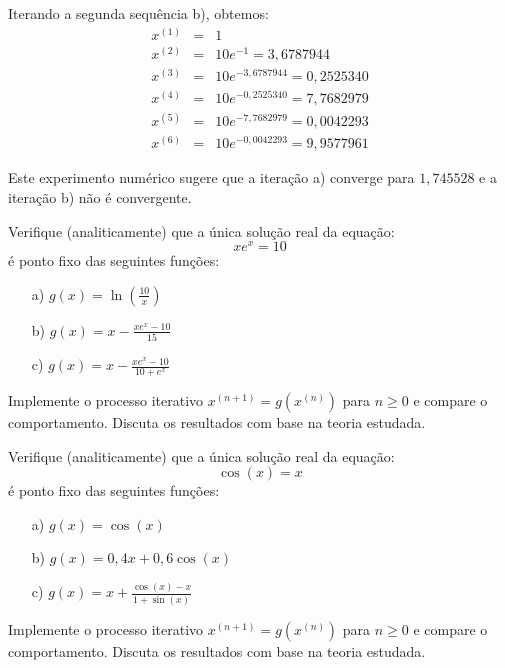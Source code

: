 \begin{ex}
\begin{resp}
Iterando a segunda sequência b), obtemos:
\begin{eqnarray}
x^{(1)}&=&1\\
x^{(2)}&=&10e^{-1}= 3,6787944   \\
x^{(3)}&=&10e^{- 3,6787944 }= 0,2525340     \\
x^{(4)}&=&10e^{-0,2525340}=  7,7682979      \\
x^{(5)}&=&10e^{-7,7682979}=  0,0042293      \\
x^{(6)}&=&10e^{-0,0042293}=  9,9577961
\end{eqnarray}

Este experimento numérico sugere que a iteração a) converge para $1,745528$ e a iteração b) não é convergente.

\end{resp}

\begin{exer} Verifique (analiticamente) que a única solução real da equação:
  \begin{equation}
    xe^x=10
  \end{equation}
é ponto fixo das seguintes funções:
\begin{itemize}
\item[a)] $g(x)=\ln\left(\frac{10}{x}\right)$
\item[b)] $g(x)=x-\frac{xe^{x}-10}{15}$
\item[c)] $g(x)=x-\frac{xe^{x}-10}{10+e^{x}}$
\end{itemize}
Implemente o processo iterativo $x^{(n+1)}=g(x^{(n)})$ para $n\geq 0$ e compare o comportamento. Discuta os resultados com base na teoria estudada.
\end{exer}

\begin{exer} Verifique (analiticamente) que a única solução real da equação:
  \begin{equation}
    \cos(x)=x
  \end{equation}
é ponto fixo das seguintes funções:
\begin{itemize}
\item[a)] $g(x)=\cos(x)$
\item[b)] $g(x)=0,4 x+ 0,6\cos(x)$
\item[c)] $g(x)=x+\frac{\cos(x)-x}{1+\sin(x)}$
\end{itemize}
Implemente o processo iterativo $x^{(n+1)}=g(x^{(n)})$ para $n\geq 0$ e compare o comportamento. Discuta os resultados com base na teoria estudada.
\end{exer}



\end{ex}
